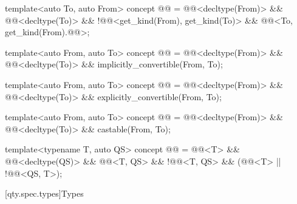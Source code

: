 \begin{itemdecl}
template<auto To, auto From>
concept @@ = @@<decltype(From)> && @@<decltype(To)> &&
                                   !@@<get_kind(From), get_kind(To)> &&
                                   @@<To, get_kind(From).@@>;

template<auto From, auto To>
concept @@ =
  @@<decltype(From)> && @@<decltype(To)> && implicitly_convertible(From, To);

template<auto From, auto To>
concept @@ =
  @@<decltype(From)> && @@<decltype(To)> && explicitly_convertible(From, To);

template<auto From, auto To>
concept @@ =
  @@<decltype(From)> && @@<decltype(To)> && castable(From, To);

template<typename T, auto QS>
concept @@ =
  @@<T> && @@<decltype(QS)> && @@<T{}, QS> &&
  !@@<T{}, QS> &&
  (@@<T> || !@@<QS, T{}>);
\end{itemdecl}

[qty.spec.types]{Types}

